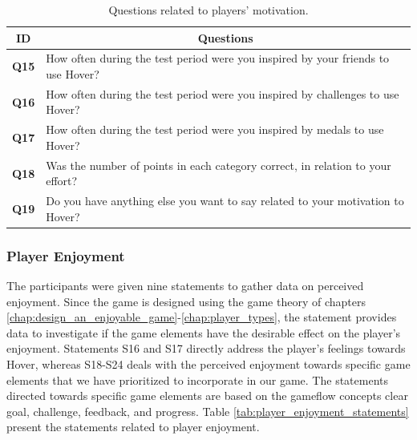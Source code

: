 \begin{table}[H]
    \centering
    \begin{tabularx}{0.95\textwidth}{|c|X|}
        \hline
        \textbf{ID} & \multicolumn{1}{c|}{\textbf{Questions}} \\ \hline
        \textbf{Q15} & How often during the test period were you inspired by your friends to use Hover? \\
        \textbf{Q16} & How often during the test period were you inspired by challenges to use Hover? \\
        \textbf{Q17} & How often during the test period were you inspired by medals to use Hover? \\
        \textbf{Q18} & Was the number of points in each category correct, in relation to your effort? \\
        \textbf{Q19} & Do you have anything else you want to say related to your motivation to Hover? \\ \hline
    \end{tabularx}
    \caption{Questions related to players' motivation.}
    \label{tab:player_motivation_questions}
\end{table}

\subsubsection{Player Enjoyment}
The participants were given nine statements to gather data on perceived enjoyment. Since the game is designed using the game theory of chapters \ref{chap:design_an_enjoyable_game}-\ref{chap:player_types}, the statement provides data to investigate if the game elements have the desirable effect on the player’s enjoyment. Statements S16 and S17 directly address the player’s feelings towards Hover, whereas S18-S24 deals with the perceived enjoyment towards specific game elements that we have prioritized to incorporate in our game. The statements directed towards specific game elements are based on the gameflow concepts clear goal, challenge, feedback, and progress. Table \ref{tab:player_enjoyment_statements} present the statements related to player enjoyment.

